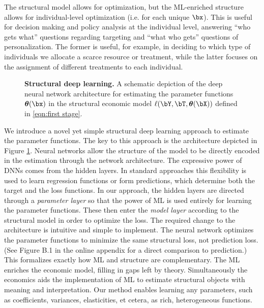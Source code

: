 \documentclass[12pt]{article}
\numberwithin{equation}{section}
\theoremstyle{definition}
\newcommand{\btheta}{\boldsymbol{\theta}}
\begin{document}
The structural model allows for optimization, but the ML-enriched structure allows for individual-level optimization (i.e. for each unique $\bx$). This is useful for decision making and policy analysis at the individual level, answering ``who gets what'' questions regarding targeting and ``what who gets'' questions of personalization. The former is useful, for example, in deciding to which type of individuals we allocate a scarce resource or treatment, while the latter focuses on the assignment of different treatments to each individual.  




\begin{figure}
	\centering
    \scalebox{0.9}{}
	\caption{{\bf Structural deep learning.} A schematic depiction of the deep neural network architecture for estimating the parameter functions $\btheta(\bx)$ in the structural economic model $\ell(\bY, \bT, \btheta(\bX))$ defined in \eqref{eqn:first stage}.}
	\label{fig:arch-general}
\end{figure}


We introduce a novel yet simple structural deep learning approach to estimate the parameter functions. The key to this approach is the architecture depicted in Figure \ref{fig:arch-general}. Neural networks allow the structure of the model to be directly encoded in the estimation through the network architecture. The expressive power of DNNs comes from the hidden layers. In standard approaches this flexibility is used to learn regression functions or form predictions, which determine both the target and the loss functions. In our approach, the hidden layers are directed through a \emph{parameter layer} so that the power of ML is used entirely for learning the parameter functions. These then enter the \emph{model layer} according to the structural model in order to optimize the loss. The required change to the architecture is intuitive and simple to implement. The neural network optimizes the parameter functions to minimize the same structural loss, not prediction loss. (See Figure B.1 in the online appendix for a direct comparison to prediction.) This formalizes exactly how ML and structure are complementary. The ML enriches the economic model, filling in gaps left by theory. Simultaneously the economics aids the implementation of ML to estimate structural objects with meaning and interpretation. Our method enables learning any parameters, such as coefficients, variances, elasticities, et cetera, as rich, heterogeneous functions. 
\end{document}
